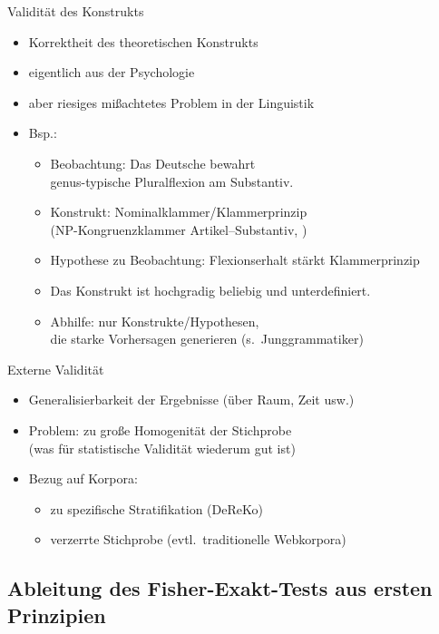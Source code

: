 \begin{frame}
  {Validität des Konstrukts}
  \begin{itemize}[<+->]
    \item Korrektheit des theoretischen Konstrukts
    \item eigentlich aus der Psychologie
    \item aber riesiges mißachtetes Problem in der Linguistik
    \item Bsp.:
      \begin{itemize}
	\item Beobachtung: Das Deutsche bewahrt\\
	  genus-typische Pluralflexion am Substantiv.
	\item Konstrukt: Nominalklammer\slash Klammerprinzip\\
	  (NP-Kongruenzklammer Artikel--Substantiv, \citealt{Ronneberger2010})
	\item Hypothese zu Beobachtung: Flexionserhalt stärkt Klammerprinzip
	\item \alert{Das Konstrukt ist hochgradig beliebig und unterdefiniert.}
	\item \alert{Abhilfe: nur Konstrukte\slash Hypothesen,\\
	  die starke Vorhersagen generieren (s.\ Junggrammatiker)}
      \end{itemize}
  \end{itemize}
\end{frame}

\begin{frame}
  {Externe Validität}
  \begin{itemize}[<+->]
    \item Generalisierbarkeit der Ergebnisse (über Raum, Zeit usw.)
    \item Problem: zu große Homogenität der Stichprobe\\
      (was für statistische Validität wiederum gut ist)
    \item Bezug auf Korpora:
      \begin{itemize}[<+->]
	\item zu spezifische Stratifikation (DeReKo)
	\item verzerrte Stichprobe (evtl.\ traditionelle Webkorpora)
      \end{itemize}
  \end{itemize}
\end{frame}

\subsection{Ableitung des Fisher-Exakt-Tests aus ersten Prinzipien}

